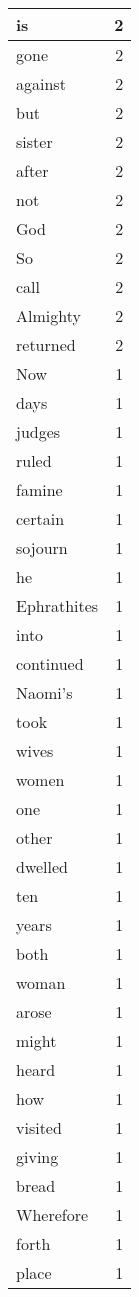 \begin{center}
\begin{longtable}{l|r}
is & 2 \\ \hline
gone & 2 \\ \hline
against & 2 \\ \hline
but & 2 \\ \hline
sister & 2 \\ \hline
after & 2 \\ \hline
not & 2 \\ \hline
God & 2 \\ \hline
So & 2 \\ \hline
call & 2 \\ \hline
Almighty & 2 \\ \hline
returned & 2 \\ \hline
Now & 1 \\ \hline
days & 1 \\ \hline
judges & 1 \\ \hline
ruled & 1 \\ \hline
famine & 1 \\ \hline
certain & 1 \\ \hline
sojourn & 1 \\ \hline
he & 1 \\ \hline
Ephrathites & 1 \\ \hline
into & 1 \\ \hline
continued & 1 \\ \hline
Naomi's & 1 \\ \hline
took & 1 \\ \hline
wives & 1 \\ \hline
women & 1 \\ \hline
one & 1 \\ \hline
other & 1 \\ \hline
dwelled & 1 \\ \hline
ten & 1 \\ \hline
years & 1 \\ \hline
both & 1 \\ \hline
woman & 1 \\ \hline
arose & 1 \\ \hline
might & 1 \\ \hline
heard & 1 \\ \hline
how & 1 \\ \hline
visited & 1 \\ \hline
giving & 1 \\ \hline
bread & 1 \\ \hline
Wherefore & 1 \\ \hline
forth & 1 \\ \hline
place & 1 \\ \hline

\end{longtable}
\end{center}
